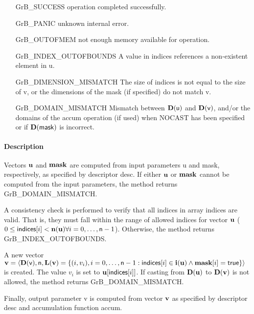 \begin{itemize}[leftmargin=2.1in]
\item[{\sf GrB\_SUCCESS}]     operation completed successfully.
\item[{\sf GrB\_PANIC}]        unknown internal error.
\item[{\sf GrB\_OUTOFMEM}]    not enough memory available for operation.
\item[{\sf GrB\_INDEX\_OUTOFBOUNDS}]
        A value in {\sf indices} references a non-existent element in {\sf u}.
\item[{\sf GrB\_DIMENSION\_MISMATCH}] 
        The size of {\sf indices} is not equal to the size of {\sf v}, or
        the dimensions of the mask (if specified) do not match {\sf v}.
\item[{\sf GrB\_DOMAIN\_MISMATCH}]    Mismatch between $\bold{D}({\sf u})$ and $\bold{D}({\sf v})$, and/or the domains of the 
                                     {\sf accum} operation (if used) when {\sf NOCAST} has
                                      been specified or if $\bold{D}(\sf mask)$ is incorrect.
\end{itemize}

\paragraph{Description}

Vectors ${\bf u}$ and ${\bf mask}$ are computed from input
parameters {\sf u} and {\sf mask}, respectively, as specified by
descriptor {\sf desc}.  If either ${\bf u}$ or ${\bf mask}$
cannot be computed from the input parameters, the method returns {\sf
GrB\_DOMAIN\_MISMATCH}.

A consistency check is performed to verify that all indices in array
{\sf indices} are valid. That is, they must fall within the range of allowed
indices for vector ${\bf u}$ ($0 \leq {\sf indices}[i] < \bold{n}({\bf u})
\forall i = 0,\ldots,{\sf n}-1$).  Otherwise, the method returns {\sf
GrB\_INDEX\_OUTOFBOUNDS}.

A new vector ${\bf v} = \langle \bold{D}({\sf v}),{\sf n},
\bold{L}({\bf v}) = \{ (i,v_i), i = 0,\ldots,{\sf n}-1 : {\sf indices}[i]
\in \bold{i}({\bf u}) \wedge {\bf mask}[i] = {\sf true} \} \rangle$
is created.  The value $v_i$ is set to ${\bf u}[{\sf indices}[i]]$. If
casting from $\bold{D}({\bf u})$ to $\bold{D}({\bf v})$ is not
allowed, the method returns {\sf GrB\_DOMAIN\_MISMATCH}.

Finally, output parameter {\sf v} is computed from vector ${\bf v}$ as
specified by descriptor {\sf desc} and accumulation function {\sf accum}.



